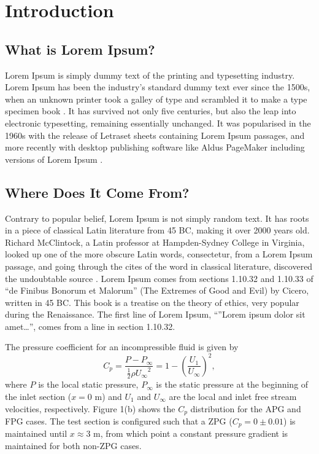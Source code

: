 \chapter{Introduction}
\label{chap:intro}

\section{What is Lorem Ipsum?}
\label{sec:apadia}

Lorem Ipsum is simply dummy text of the printing and typesetting industry. Lorem Ipsum has been the industry's standard dummy text ever since the 1500s, when an unknown printer took a galley of type and scrambled it to make a type specimen book \cite{banerjee:pedersen:2003}. It has survived not only five centuries, but also the leap into electronic typesetting, remaining essentially unchanged. It was popularised in the 1960s with the release of Letraset sheets containing Lorem Ipsum passages, and more recently with desktop publishing software like Aldus PageMaker including versions of Lorem Ipsum \cite{berment:phd:2004}.



\section{Where Does It Come From?}
\label{sec:where}

Contrary to popular belief, Lorem Ipsum is not simply random text. It has roots in a piece of classical Latin literature from 45 BC, making it over 2000 years old. Richard McClintock, a Latin professor at Hampden-Sydney College in Virginia, looked up one of the more obscure Latin words, consectetur, from a Lorem Ipsum passage, and going through the cites of the word in classical literature, discovered the undoubtable source \cite{azarova:etal:2002,budanitsky:hirst:2006}. Lorem Ipsum comes from sections 1.10.32 and 1.10.33 of ``de Finibus Bonorum et Malorum'' (The Extremes of Good and Evil) by Cicero, written in 45 BC. This book is a treatise on the theory of ethics, very popular during the Renaissance. The first line of Lorem Ipsum, ``''Lorem ipsum dolor sit amet\ldots'', comes from a line in section 1.10.32.


The pressure coefficient for an incompressible fluid is given by
\begin{equation}
C_p = \frac{P - P_\infty}{\frac{1}{2} \rho {U_\infty}^2}
 = 1 - \left( \frac{U_1}{U_\infty} \right)^2,
\end{equation}
where $P$ is the local static pressure, $P_\infty$ is the static pressure at the beginning of the inlet section ($x = 0$ m) and $U_1$ and $U_\infty$ are the local and inlet free stream velocities, respectively. Figure 1(b) shows the $C_p$ distribution for the APG and FPG cases. The test section is configured such that a ZPG ($C_p = 0 \pm 0.01$) is maintained until $x \approx 3$ m, from which point a constant pressure gradient is maintained for both non-ZPG cases.

